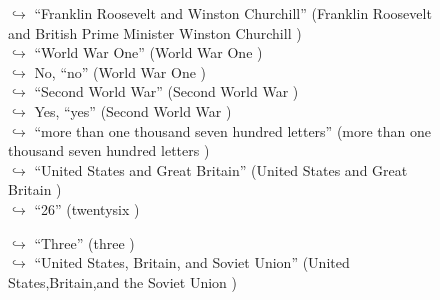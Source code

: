 \documentclass[11pt,a4paper, onecolumn]{article}
\begin{document}
\begin{figure}[t] \small \begin{tcolorbox}[boxsep=0pt,left=5pt,right=0pt,top=2pt,colback = yellow!5] \begin{dialogue}
 \small 
\colorbox{pink!25}{$\hookrightarrow$}
{ ``Franklin Roosevelt and Winston Churchill'' (Franklin Roosevelt and British Prime Minister Winston Churchill ) }
\\
\colorbox{pink!25}{$\hookrightarrow$}
{ ``World War One'' (World War One ) }
\\
\colorbox{pink!25}{$\hookrightarrow$}
\colorbox{red!25}{No,}
{ ``no'' (World War One ) }
\\
\colorbox{pink!25}{$\hookrightarrow$}
{ ``Second World War'' (Second World War ) }
\\
\colorbox{pink!25}{$\hookrightarrow$}
\colorbox{red!25}{Yes,}
{ ``yes'' (Second World War ) }
\\
\colorbox{pink!25}{$\hookrightarrow$}
{ ``more than one thousand seven hundred letters'' (more than one thousand seven hundred letters ) }
\\
\colorbox{pink!25}{$\hookrightarrow$}
{ ``United States and Great Britain'' (United States and Great Britain ) }
\\
\colorbox{pink!25}{$\hookrightarrow$}
{ ``26'' (twentysix ) }
 \end{dialogue}\end{tcolorbox}\end{figure}\begin{figure}[t] \small \begin{tcolorbox}[boxsep=0pt,left=5pt,right=0pt,top=2pt,colback = yellow!5] \begin{dialogue}
 \small 
\colorbox{pink!25}{$\hookrightarrow$}
{ ``Three'' (three ) }
\\
\colorbox{pink!25}{$\hookrightarrow$}
{ ``United States, Britain, and Soviet Union'' (United States,Britain,and the Soviet Union ) }

\end{dialogue}
\end{tcolorbox}
\end{figure}
\end{document}
